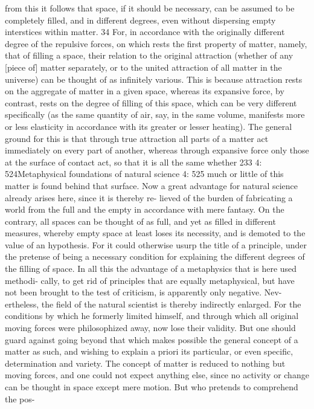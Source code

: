 from this it follows that space, if it should be necessary, can be assumed
to be completely ﬁlled, and in different degrees, even without dispersing
empty interstices within matter. 34 For, in accordance with the originally
different degree of the repulsive forces, on which rests the ﬁrst property
of matter, namely, that of ﬁlling a space, their relation to the original
attraction (whether of any [piece of] matter separately, or to the united
attraction of all matter in the universe) can be thought of as inﬁnitely
various. This is because attraction rests on the aggregate of matter in a
given space, whereas its expansive force, by contrast, rests on the degree
of ﬁlling of this space, which can be very different speciﬁcally (as the
same quantity of air, say, in the same volume, manifests more or less
elasticity in accordance with its greater or lesser heating). The general
ground for this is that through true attraction all parts of a matter act
immediately on every part of another, whereas through expansive force
only those at the surface of contact act, so that it is all the same whether
233
4: 524Metaphysical foundations of natural science
4: 525
much or little of this matter is found behind that surface. Now a great
advantage for natural science already arises here, since it is thereby re-
lieved of the burden of fabricating a world from the full and the empty in
accordance with mere fantasy. On the contrary, all spaces can be thought
of as full, and yet as ﬁlled in different measures, whereby empty space at
least loses its necessity, and is demoted to the value of an hypothesis. For
it could otherwise usurp the title of a principle, under the pretense of
being a necessary condition for explaining the different degrees of the
ﬁlling of space.
In all this the advantage of a metaphysics that is here used methodi-
cally, to get rid of principles that are equally metaphysical, but have not
been brought to the test of criticism, is apparently only negative. Nev-
ertheless, the ﬁeld of the natural scientist is thereby indirectly enlarged.
For the conditions by which he formerly limited himself, and through
which all original moving forces were philosophized away, now lose their
validity. But one should guard against going beyond that which makes
possible the general concept of a matter as such, and wishing to explain
a priori its particular, or even speciﬁc, determination and variety. The
concept of matter is reduced to nothing but moving forces, and one could
not expect anything else, since no activity or change can be thought in
space except mere motion. But who pretends to comprehend the pos-

